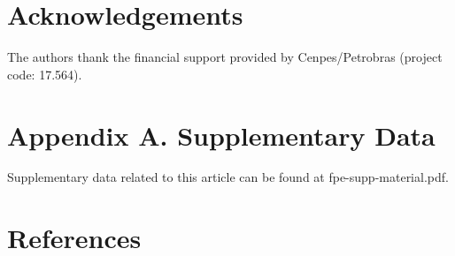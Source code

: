 \documentclass[final,12p,times,twocolumn]{elsarticle}
\begin{document}
	
	\section*{Acknowledgements}
	
	The authors thank the financial support provided by Cenpes/Petrobras (project code: 17.564). 
	
	\section*{Appendix A. Supplementary Data}
	
	Supplementary data related to this article can be found at fpe-supp-material.pdf.
	
	\section*{References}
	
	
	
\end{document}
